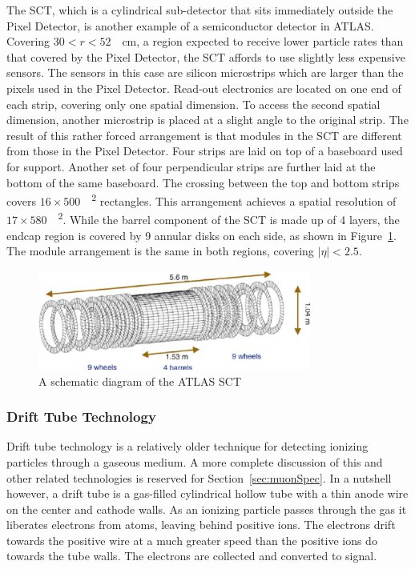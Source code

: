 \par The SCT, which is a cylindrical sub-detector that sits immediately outside 
the Pixel Detector, is another example of a semiconductor detector in ATLAS. 
Covering $30<r<52$~\SI{}{\cm}, a region expected to receive lower particle 
rates than that covered by the Pixel Detector, the SCT affords to use slightly 
less expensive sensors. The sensors in this case are silicon microstrips 
 which are larger than the pixels used in the Pixel Detector.  
Read-out electronics are located on one end of each strip, covering only 
one spatial dimension. To access the second spatial dimension, another microstrip is placed 
at a slight angle to the original strip. The result of this rather forced arrangement is that 
modules in the SCT are different from those in the Pixel Detector. Four strips are laid on 
top of a baseboard used for support. Another set of four perpendicular strips are further laid at 
the bottom of the same baseboard. The crossing between the top and bottom strips covers 
$16\times500$~\SI{}{\micron^2} rectangles. This arrangement achieves a spatial resolution of 
$17\times 580$~\SI{}{\micron^2}. 
While the barrel component of the SCT is made up of 4 layers, the endcap region
 is covered by 9 annular disks on each side, as shown in Figure~\ref{fig:sctD}.
The module arrangement is the same in both regions, covering $|\eta|<2.5$. 

\begin{figure}[!h]
	\centering
   \includegraphics[width=0.8\textwidth]{figures/sct.png}
	\caption{A schematic diagram of the ATLAS SCT}
	\label{fig:sctD}
\end{figure}

\subsubsection{Drift Tube Technology}
\par Drift tube technology is a relatively older technique for detecting ionizing particles
 through a gaseous medium. A more complete discussion of this and other related technologies 
is reserved for Section~\ref{sec:muonSpec}. In a nutshell however, a drift tube is a gas-filled 
cylindrical hollow tube with a thin anode wire on the center and cathode walls. As an ionizing
 particle passes through the gas it liberates electrons 
from atoms, leaving behind positive ions. The electrons drift towards the positive wire at a much greater speed 
than the positive ions do towards the tube walls. The electrons are collected and converted to signal. 

